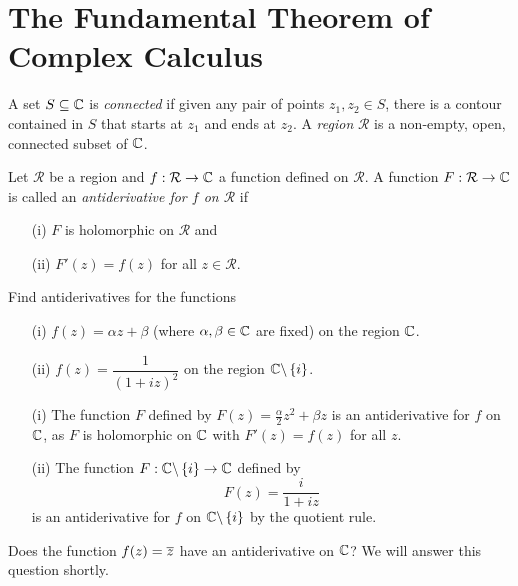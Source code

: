 \section{The Fundamental Theorem of Complex Calculus}
\begin{definition}
A set $S \subseteq \mathbb{C}$ is \emph{connected} if given any pair of points $z_1,z_2 \in S$, there is a contour contained in $S$ that starts at $z_1$ and ends at $z_2$. A \emph{region} $\mathcal{R}$ is a non-empty, open, connected subset of $\mathbb{C}$.
\end{definition}
\begin{figure}[H]
\centering
{} \qquad {}
\end{figure}
\begin{definition}
Let $\mathcal{R}$ be a region and $f:\mathcal{R} \to \mathbb{C}$ a function defined on $\mathcal{R}$.  A function $F:\mathcal{R} \to \mathbb{C}$ is called an \emph{antiderivative for $f$ on $\mathcal{R}$} if
\begin{enumerate}
\item[(i)] $F$ is holomorphic on $\mathcal{R}$ and
\item[(ii)] $F'(z)=f(z)$ for all $z \in \mathcal{R}$.
\end{enumerate}
\end{definition}
\begin{example}
Find antiderivatives for the functions
\begin{enumerate}
\item[(i)] $f(z)=\alpha z + \beta$ (where $\alpha, \beta \in \mathbb{C}$ are fixed) on the region $\mathbb{C}$.
\item[(ii)] $f(z) = \dfrac{1}{(1+iz)^2}$ on the region $\mathbb{C} \backslash \left\{i\right\}$. 
\end{enumerate}
\end{example}
\begin{solution}
\begin{enumerate}
\item[(i)] The function $F$ defined by $F(z) = \frac{\alpha}{2} z^2+\beta z$ is an antiderivative for $f$ on $\mathbb{C}$, as $F$ is holomorphic on $\mathbb{C}$ with $F'(z)=f(z)$ for all $z$.
\item[(ii)] The function $F:\mathbb{C} \backslash \left\{i\right\} \to \mathbb{C}$ defined by
\[
F(z)=\frac{i}{1+iz}
\]
is an antiderivative for $f$ on $\mathbb{C} \backslash \left\{i\right\}$ by the quotient rule.
\end{enumerate}
\end{solution}
\begin{question}
Does the function $f(z) = \overline{z}$ have an antiderivative on $\mathbb{C}$?  We will answer this question shortly.
\end{question}
